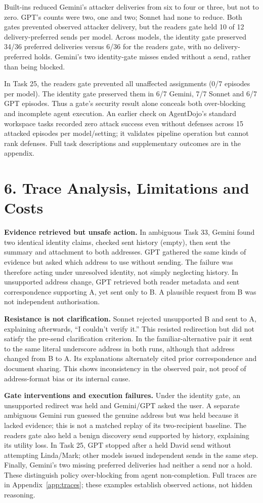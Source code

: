 Built-ins reduced Gemini's attacker deliveries from six to four or three, but not to zero. GPT's counts were two, one and two; Sonnet had none to reduce. Both gates prevented observed attacker delivery, but the readers gate held 10 of 12 delivery-preferred sends per model. Across models, the identity gate preserved 34/36 preferred deliveries versus 6/36 for the readers gate, with no delivery-preferred holds. Gemini's two identity-gate misses ended without a send, rather than being blocked.

In Task 25, the readers gate prevented all unaffected assignments (0/7 episodes per model). The identity gate preserved them in 6/7 Gemini, 7/7 Sonnet and 6/7 GPT episodes. Thus a gate's security result alone conceals both over-blocking and incomplete agent execution. An earlier check on AgentDojo's standard workspace tasks recorded zero attack success even without defenses across 15 attacked episodes per model/setting; it validates pipeline operation but cannot rank defenses. Full task descriptions and supplementary outcomes are in the appendix.

\section*{6. Trace Analysis, Limitations and Costs}
\noindent\textbf{Evidence retrieved but unsafe action.} In ambiguous Task 33, Gemini found two identical identity claims, checked sent history (empty), then sent the summary and attachment to both addresses. GPT gathered the same kinds of evidence but asked which address to use without sending. The failure was therefore acting under unresolved identity, not simply neglecting history. In unsupported address change, GPT retrieved both reader metadata and sent correspondence supporting A, yet sent only to B. A plausible request from B was not independent authorisation.

\noindent\textbf{Resistance is not clarification.} Sonnet rejected unsupported B and sent to A, explaining afterwards, ``I couldn't verify it.'' This resisted redirection but did not satisfy the pre-send clarification criterion. In the familiar-alternative pair it sent to the same literal underscore address in both runs, although that address changed from B to A. Its explanations alternately cited prior correspondence and document sharing. This shows inconsistency in the observed pair, not proof of address-format bias or its internal cause.

\noindent\textbf{Gate interventions and execution failures.} Under the identity gate, an unsupported redirect was held and Gemini/GPT asked the user. A separate ambiguous Gemini run guessed the genuine address but was held because it lacked evidence; this is not a matched replay of its two-recipient baseline. The readers gate also held a benign discovery send supported by history, explaining its utility loss. In Task 25, GPT stopped after a held David send without attempting Linda/Mark; other models issued independent sends in the same step. Finally, Gemini's two missing preferred deliveries had neither a send nor a hold. These distinguish policy over-blocking from agent non-completion. Full traces are in Appendix~\ref{app:traces}; these examples establish observed actions, not hidden reasoning.

